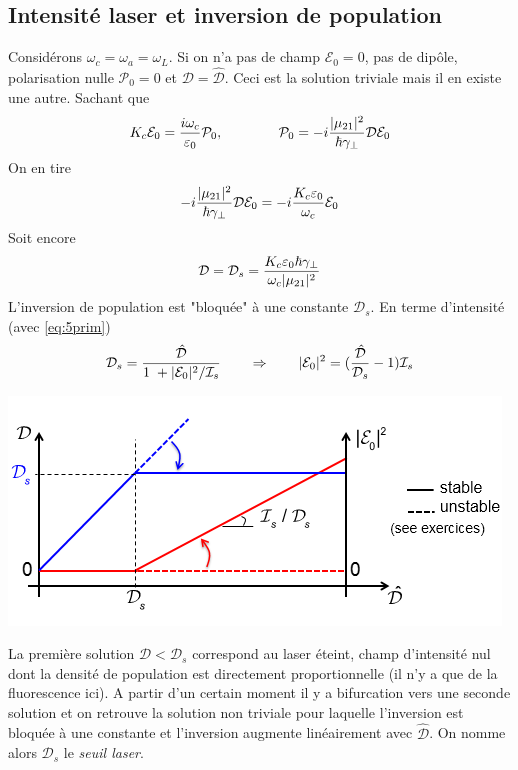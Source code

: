 \subsection{Intensité laser et inversion de population}
Considérons $\omega_c=\omega_a=\omega_L$. Si on n'a pas de champ $\mathcal{E}_0=0$, pas de dipôle, polarisation nulle $\mathcal{P}_0=0$ et $\mathcal{D}=\hat{\mathcal{D}}$. Ceci est la solution 
triviale mais il en existe une autre. Sachant que 
\begin{equation}
{K_c}{{\cal E}_0} = \frac{{i{\omega _c}}}{{{\varepsilon _0}}}{{\cal P}_0},\qquad\qquad 
{{\cal P}_0} =  - i\frac{{|{\mu _{21}}{|^2}}}{{\hbar {\gamma _ \bot }}}{\cal D}{{\cal E}_0}
\end{equation}
On en tire
\begin{equation}
 - i\frac{{|{\mu _{21}}{|^2}}}{{\hbar {\gamma _ \bot }}}{\cal D}{{\cal E}_0} =  - i\frac{{{K_c}{\varepsilon _0}}}{{{\omega _c}}}{{\cal E}_0}
\end{equation}
Soit encore
\begin{equation}
{\cal D} = {{\cal D}_s} = \frac{{{K_c}{\varepsilon _0}\hbar {\gamma _ \bot }}}{{{\omega _c}|{\mu _{21}}{|^2}}}
\end{equation}
L'inversion de population est "bloquée" à une constante $\mathcal{D}_s$. En terme d'intensité (avec
\eqref{eq:5prim})
\begin{equation}
{{{\cal D}}_s} = \frac{{{\hat {\cal D}}}}{{1\; + |{{\cal E}_0}{|^2}/{{{\cal I}}_s}}}
\qquad\Rightarrow\qquad |{{\cal E}_0}{|^2} = (\frac{{{\hat {\cal D}}}}{{{{{\cal D}}_s}}} - 1){{{\cal I}}_s}
\end{equation}
\begin{center}
	\includegraphics[scale=0.7]{ch3/image8.png}
\end{center}
La première solution $\mathcal{D}<\mathcal{D}_s$ correspond au laser éteint, champ d'intensité nul 
dont la densité de population est directement proportionnelle (il n'y a que de la fluorescence ici). A partir d'un certain moment il y a bifurcation vers une seconde solution et on retrouve la solution 
non triviale pour laquelle l'inversion est bloquée à une constante et l'inversion augmente 
linéairement avec $\hat{\mathcal{D}}$. On nomme alors $\mathcal{D}_s$ le \textit{seuil laser}.\\


